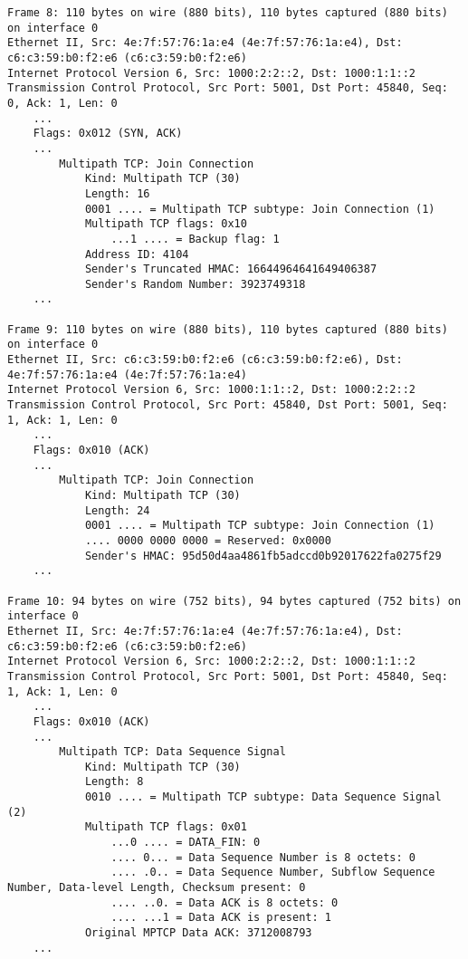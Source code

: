 \begin{verbatim}
Frame 8: 110 bytes on wire (880 bits), 110 bytes captured (880 bits) on interface 0
Ethernet II, Src: 4e:7f:57:76:1a:e4 (4e:7f:57:76:1a:e4), Dst: c6:c3:59:b0:f2:e6 (c6:c3:59:b0:f2:e6)
Internet Protocol Version 6, Src: 1000:2:2::2, Dst: 1000:1:1::2
Transmission Control Protocol, Src Port: 5001, Dst Port: 45840, Seq: 0, Ack: 1, Len: 0
    ...
    Flags: 0x012 (SYN, ACK)
    ...
        Multipath TCP: Join Connection
            Kind: Multipath TCP (30)
            Length: 16
            0001 .... = Multipath TCP subtype: Join Connection (1)
            Multipath TCP flags: 0x10
                ...1 .... = Backup flag: 1
            Address ID: 4104
            Sender's Truncated HMAC: 16644964641649406387
            Sender's Random Number: 3923749318
    ...

Frame 9: 110 bytes on wire (880 bits), 110 bytes captured (880 bits) on interface 0
Ethernet II, Src: c6:c3:59:b0:f2:e6 (c6:c3:59:b0:f2:e6), Dst: 4e:7f:57:76:1a:e4 (4e:7f:57:76:1a:e4)
Internet Protocol Version 6, Src: 1000:1:1::2, Dst: 1000:2:2::2
Transmission Control Protocol, Src Port: 45840, Dst Port: 5001, Seq: 1, Ack: 1, Len: 0
    ...
    Flags: 0x010 (ACK)
    ...
        Multipath TCP: Join Connection
            Kind: Multipath TCP (30)
            Length: 24
            0001 .... = Multipath TCP subtype: Join Connection (1)
            .... 0000 0000 0000 = Reserved: 0x0000
            Sender's HMAC: 95d50d4aa4861fb5adccd0b92017622fa0275f29
    ...

Frame 10: 94 bytes on wire (752 bits), 94 bytes captured (752 bits) on interface 0
Ethernet II, Src: 4e:7f:57:76:1a:e4 (4e:7f:57:76:1a:e4), Dst: c6:c3:59:b0:f2:e6 (c6:c3:59:b0:f2:e6)
Internet Protocol Version 6, Src: 1000:2:2::2, Dst: 1000:1:1::2
Transmission Control Protocol, Src Port: 5001, Dst Port: 45840, Seq: 1, Ack: 1, Len: 0
    ...
    Flags: 0x010 (ACK)
    ...
        Multipath TCP: Data Sequence Signal
            Kind: Multipath TCP (30)
            Length: 8
            0010 .... = Multipath TCP subtype: Data Sequence Signal (2)
            Multipath TCP flags: 0x01
                ...0 .... = DATA_FIN: 0
                .... 0... = Data Sequence Number is 8 octets: 0
                .... .0.. = Data Sequence Number, Subflow Sequence Number, Data-level Length, Checksum present: 0
                .... ..0. = Data ACK is 8 octets: 0
                .... ...1 = Data ACK is present: 1
            Original MPTCP Data ACK: 3712008793
    ...

	\end{verbatim}
\endgroup